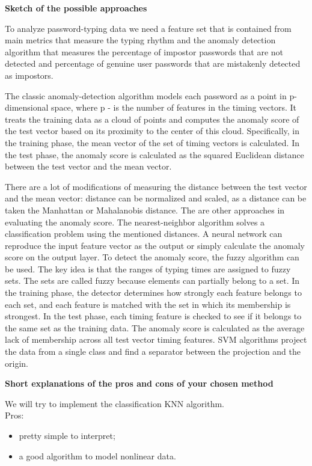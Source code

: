 \documentclass[12pt,a4]{article}
\begin{document}
\bigskip
\large\textbf{Sketch of the possible approaches }
\bigskip

\normalsize
To analyze password-typing data we need a feature set that is contained from main metrics that measure the typing rhythm and the anomaly detection algorithm that measures the percentage of impostor passwords that are not detected and percentage of genuine user passwords that are mistakenly detected as impostors.  

The classic anomaly-detection algorithm \cite{duda2001_patternClass} models each password as a point in p-dimensional space, where p - is the number of features in the timing vectors. It treats the training data as a cloud of points and computes the anomaly score of the test vector based on its proximity to the center of this cloud. Specifically, in the training phase, the mean vector of the set of timing vectors is calculated. In the test phase, the anomaly score is calculated as the squared Euclidean distance between the test vector and the mean vector.

There are a lot of modifications of measuring the distance between the test vector and the mean vector: distance can be normalized and scaled, as a distance can be taken the Manhattan or Mahalanobis distance. 
The are other approaches in evaluating the anomaly score. The nearest-neighbor algorithm solves a classification problem using the mentioned distances. A neural network can reproduce the input feature vector as the output or simply calculate the anomaly score on the output layer. To detect the anomaly score, the fuzzy algorithm can be used. The key idea is that the ranges of typing times are assigned to fuzzy sets. The sets are called fuzzy because elements can partially belong to a set. In the training phase, the detector determines how strongly each feature belongs to each set, and each feature is matched with the set in which its membership is strongest. In the test phase, each timing feature is checked to see if it belongs to the same set as the training data. The anomaly score is calculated as the average lack of membership across all test vector timing features. SVM algorithms project the data from a single class and find a separator between the projection and the origin.

\newpage
\bigskip
\large\textbf{Short explanations of the pros and cons of your chosen method}
\bigskip

\normalsize
We will try to implement the classification KNN algorithm.\\
Pros:
\begin{itemize}
    \item pretty simple to interpret;
    \item a good algorithm to model nonlinear data. 
\end{itemize}
\end{document}
